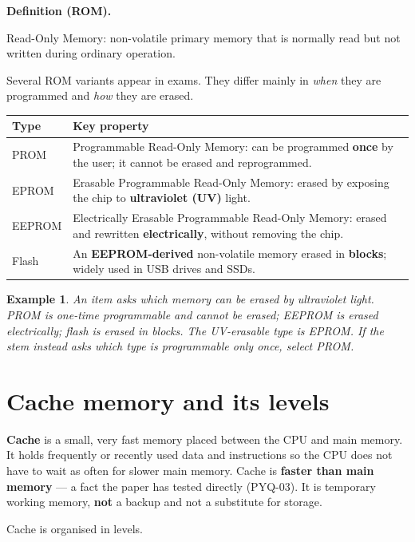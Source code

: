 \documentclass[11pt]{article}
\newtheorem{example}{Example}[section]
\newenvironment{definitionbox}[1]{%
  \par\noindent\textbf{Definition (#1).}\ \itshape
}{\par\vspace{0.3em}}
\begin{document}
\begin{definitionbox}{ROM}
Read-Only Memory: non-volatile primary memory that is normally read but not
written during ordinary operation.
\end{definitionbox}

Several ROM variants appear in exams. They differ mainly in \emph{when} they
are programmed and \emph{how} they are erased.

\begin{center}
\begin{tabular}{p{}p{}}
\toprule
\textbf{Type} & \textbf{Key property}\\
\midrule
PROM & Programmable Read-Only Memory: can be programmed \textbf{once} by the user; it cannot be erased and reprogrammed.\\
EPROM & Erasable Programmable Read-Only Memory: erased by exposing the chip to \textbf{ultraviolet (UV)} light.\\
EEPROM & Electrically Erasable Programmable Read-Only Memory: erased and rewritten \textbf{electrically}, without removing the chip.\\
Flash & An \textbf{EEPROM-derived} non-volatile memory erased in \textbf{blocks}; widely used in USB drives and SSDs.\\
\bottomrule
\end{tabular}
\end{center}

\begin{example}
An item asks which memory can be erased by ultraviolet light. PROM is
one-time programmable and cannot be erased; EEPROM is erased electrically;
flash is erased in blocks. The UV-erasable type is EPROM. If the stem
instead asks which type is programmable only once, select PROM.
\end{example}

\section{Cache memory and its levels}
\textbf{Cache} is a small, very fast memory placed between the CPU and main
memory. It holds frequently or recently used data and instructions so the
CPU does not have to wait as often for slower main memory. Cache is
\textbf{faster than main memory} --- a fact the paper has tested directly
(PYQ-03). It is temporary working memory, \textbf{not} a backup and not a
substitute for storage.

Cache is organised in levels.
\end{document}

